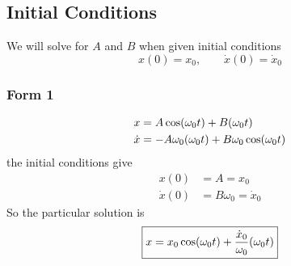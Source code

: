 \documentclass{article}
\let\sin\relax
\DeclareMathOperator{\sin}{\smash{\mathrm{sin}}}
\begin{document}
\subsection{Initial Conditions}
We will solve for $A$ and $B$ when given initial conditions
\begin{equation*}
    x(0) = x_0, \qquad \dot{x}(0) = \dot{x}_0
\end{equation*}
\subsubsection{Form 1}
\begin{align*}
    x &= A\cos(\omega_0t) + B\sin(\omega_0t) \\ 
    \dot{x} &= -A\omega_0\sin(\omega_0t) + B\omega_0\cos(\omega_0t) 
\end{align*}
the initial conditions give
\begin{align*}
    x(0) &= A = x_0\\ 
    \dot{x}(0) &=  B\omega_0 = \dot{x}_0
\end{align*}
So the particular solution is
\begin{equation*}
    \boxed{x = x_0\cos(\omega_0t) + \frac{\dot{x}_0}{\omega_0}\sin(\omega_0t)}
\end{equation*}
\end{document}
